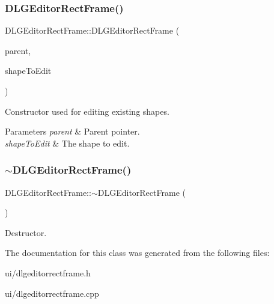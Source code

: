 \subsubsection{\texorpdfstring{DLGEditorRectFrame()}{DLGEditorRectFrame()}\hspace{0.1cm}{\footnotesize\ttfamily [2/2]}}
{\footnotesize\ttfamily D\+L\+G\+Editor\+Rect\+Frame\+::\+D\+L\+G\+Editor\+Rect\+Frame (\begin{DoxyParamCaption}\item[{Q\+Widget $\ast$}]{parent,  }\item[{\mbox{\hyperlink{class_i_shape}{I\+Shape}} $\ast$}]{shape\+To\+Edit }\end{DoxyParamCaption})\hspace{0.3cm}{\ttfamily [explicit]}}



Constructor used for editing existing shapes. 


\begin{DoxyParams}{Parameters}
{\em parent} & Parent pointer. \\
\hline
{\em shape\+To\+Edit} & The shape to edit. \\
\hline
\end{DoxyParams}
\mbox{\label{class_d_l_g_editor_rect_frame_a1d27bddcdac8f640544fd7768cfb0e02}} 
\subsubsection{\texorpdfstring{$\sim$DLGEditorRectFrame()}{~DLGEditorRectFrame()}}
{\footnotesize\ttfamily D\+L\+G\+Editor\+Rect\+Frame\+::$\sim$\+D\+L\+G\+Editor\+Rect\+Frame (\begin{DoxyParamCaption}{ }\end{DoxyParamCaption})\hspace{0.3cm}{\ttfamily [override]}}



Destructor. 



The documentation for this class was generated from the following files\+:\begin{DoxyCompactItemize}
\item 
ui/dlgeditorrectframe.\+h\item 
ui/dlgeditorrectframe.\+cpp\end{DoxyCompactItemize}
